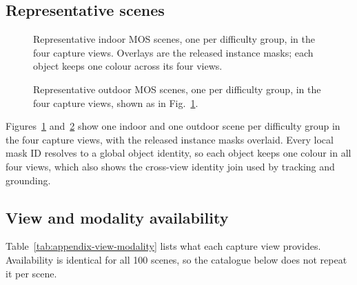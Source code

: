 \subsection{Representative scenes}

\begin{figure}[p]
\centering
{}
\caption{Representative indoor MOS scenes, one per difficulty group, in the four capture views. Overlays are the released instance masks; each object keeps one colour across its four views.}
\label{fig:appendix-representative-indoor}
\end{figure}

\begin{figure}[p]
\centering
{}
\caption{Representative outdoor MOS scenes, one per difficulty group, in the four capture views, shown as in Fig.~\ref{fig:appendix-representative-indoor}.}
\label{fig:appendix-representative-outdoor}
\end{figure}

Figures~\ref{fig:appendix-representative-indoor} and~\ref{fig:appendix-representative-outdoor} show one indoor and one outdoor scene per difficulty group in the four capture views, with the released instance masks overlaid. Every local mask ID resolves to a global object identity, so each object keeps one colour in all four views, which also shows the cross-view identity join used by tracking and grounding.

\subsection{View and modality availability}

Table~\ref{tab:appendix-view-modality} lists what each capture view provides. Availability is identical for all 100 scenes, so the catalogue below does not repeat it per scene.

